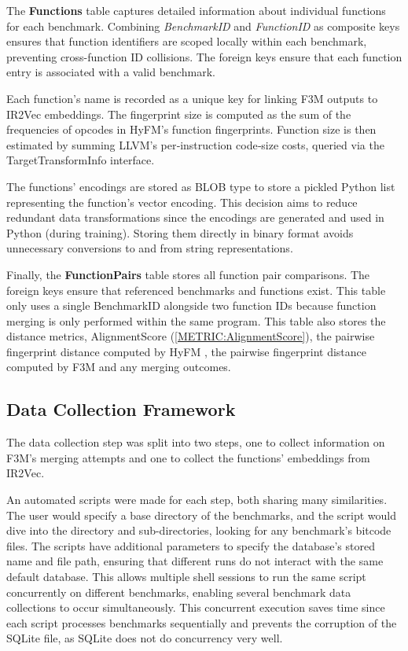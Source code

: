 The \textbf{Functions} table captures detailed information about individual functions for each benchmark. Combining \textit{BenchmarkID} and \textit{FunctionID} as composite keys ensures that function identifiers are scoped locally within each benchmark, preventing cross-function ID collisions. The foreign keys ensure that each function entry is associated with a valid benchmark.

Each function's name is recorded as a unique key for linking F3M outputs to IR2Vec embeddings. The fingerprint size is computed as the sum of the frequencies of opcodes in HyFM's function fingerprints. Function size is then estimated by summing LLVM's per‑instruction code‑size costs, queried via the TargetTransformInfo interface.

The functions' encodings are stored as BLOB type to store a pickled Python list representing the function's vector encoding. This decision aims to reduce redundant data transformations since the encodings are generated and used in Python (during training). Storing them directly in binary format avoids unnecessary conversions to and from string representations.

Finally, the \textbf{FunctionPairs} table stores all function pair comparisons. The foreign keys ensure that referenced benchmarks and functions exist. This table only uses a single BenchmarkID alongside two function IDs because function merging is only performed within the same program. This table also stores the distance metrics, AlignmentScore (\ref{METRIC:AlignmentScore}), the pairwise fingerprint distance computed by HyFM \cite{HyFM:FunctionMergingForFree}, the pairwise fingerprint distance computed by F3M and any merging outcomes.

\subsection{Data Collection Framework}
The data collection step was split into two steps, one to collect information on F3M's merging attempts and one to collect the functions' embeddings from IR2Vec.

An automated scripts were made for each step, both sharing many similarities. The user would specify a base directory of the benchmarks, and the script would dive into the directory and sub-directories, looking for any benchmark's bitcode files. 
The scripts have additional parameters to specify the database's stored name and file path, ensuring that different runs do not interact with the same default database. This allows multiple shell sessions to run the same script concurrently on different benchmarks, enabling several benchmark data collections to occur simultaneously. This concurrent execution saves time since each script processes benchmarks sequentially and prevents the corruption of the SQLite file, as SQLite does not do concurrency very well.

